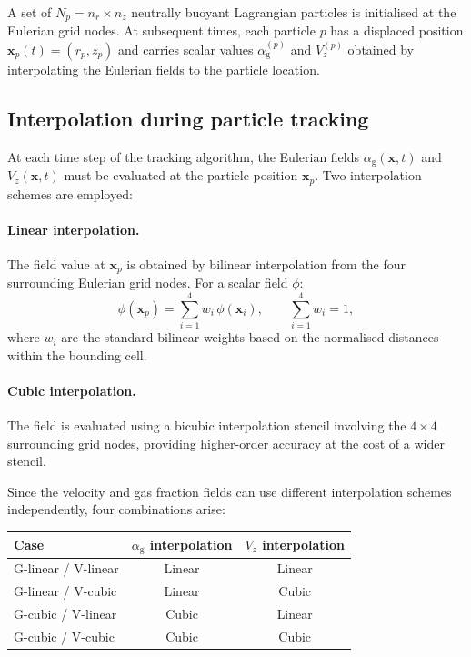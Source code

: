 \documentclass[11pt,a4paper]{article}
\newcommand{\alphag}{\alpha_{\mathrm{g}}}
\newcommand{\Vz}{V_z}
\begin{document}
A set of $N_p = n_r \times n_z$ neutrally buoyant Lagrangian particles is
initialised at the Eulerian grid nodes.  At subsequent times, each particle
$p$ has a displaced position $\bm{x}_p(t) = (r_p, z_p)$ and carries scalar
values $\alphag^{(p)}$ and $\Vz^{(p)}$ obtained by interpolating the
Eulerian fields to the particle location.

\subsection{Interpolation during particle tracking}
\label{sec:interp_tracking}

At each time step of the tracking algorithm, the Eulerian fields
$\alphag(\bm{x},t)$ and $\Vz(\bm{x},t)$ must be evaluated at the
particle position $\bm{x}_p$.  Two interpolation schemes are employed:

\paragraph{Linear interpolation.}
The field value at $\bm{x}_p$ is obtained by bilinear interpolation from
the four surrounding Eulerian grid nodes.  For a scalar field $\phi$:
\begin{equation}\label{eq:bilinear}
  \phi(\bm{x}_p) = \sum_{i=1}^{4} w_i \, \phi(\bm{x}_i)
  ,\qquad
  \sum_{i=1}^{4} w_i = 1,
\end{equation}
where $w_i$ are the standard bilinear weights based on the normalised
distances within the bounding cell.

\paragraph{Cubic interpolation.}
The field is evaluated using a bicubic interpolation stencil involving the
$4\times 4$ surrounding grid nodes, providing higher-order accuracy at the
cost of a wider stencil.

Since the velocity and gas fraction fields can use different interpolation
schemes independently, four combinations arise:
\begin{center}
\begin{tabular}{lcc}
  \toprule
  Case & $\alphag$ interpolation & $\Vz$ interpolation \\
  \midrule
  G-linear / V-linear & Linear & Linear \\
  G-linear / V-cubic  & Linear & Cubic  \\
  G-cubic  / V-linear & Cubic  & Linear \\
  G-cubic  / V-cubic  & Cubic  & Cubic  \\
  \bottomrule
\end{tabular}
\end{center}
\end{document}
